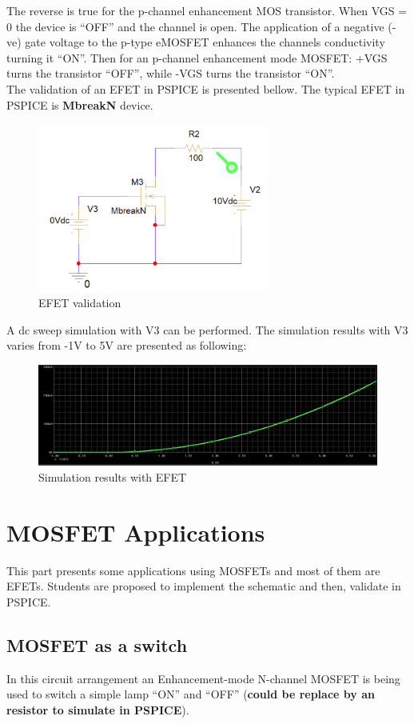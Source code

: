The reverse is true for the p-channel enhancement MOS transistor. When VGS = 0 the device is “OFF” and the channel is open. The application of a negative (-ve) gate voltage to the p-type eMOSFET enhances the channels conductivity turning it “ON”. Then for an p-channel enhancement mode MOSFET: +VGS turns the transistor “OFF”, while -VGS turns the transistor “ON”. \\

The validation of an EFET in PSPICE is presented bellow. The typical EFET in PSPICE is \textbf{MbreakN} device.

\begin{figure}[!htp]
    \centering
    \includegraphics[width = 3in]{source/picture/bai_6/efet1.PNG}
    \caption{EFET validation}
    \label{efet_1}
\end{figure}

A dc sweep simulation with V3 can be performed. The simulation results with V3 varies from -1V to 5V are presented as following:
\begin{figure}[!htp]
    \centering
    \includegraphics[width = 4.5in]{source/picture/bai_6/efet2.PNG}
    \caption{Simulation results with EFET}
    \label{efet_1}
\end{figure}

\section{MOSFET Applications}
This part presents some applications using MOSFETs and most of them are EFETs. Students are proposed to implement the schematic and then, validate in PSPICE.
\subsection{MOSFET as a switch}
In this circuit arrangement an Enhancement-mode N-channel MOSFET is being used to switch a simple lamp “ON” and “OFF” (\textbf{could be replace by an resistor to simulate in PSPICE}).


